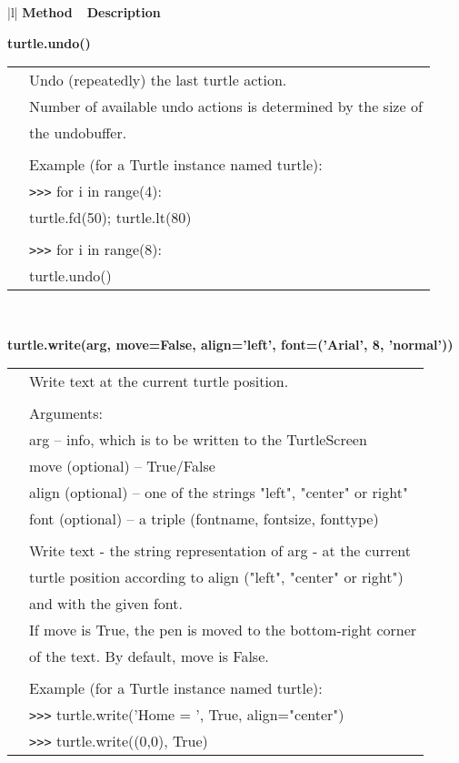 \begin{center}
{\small
\begin{tabular}{|l|} \hline
{\bf Method~~Description}  \\ \hline\hline 


{\bf    turtle.undo()} \\
   \begin{tabular}{p{0.25in}p{4in}}
&        Undo (repeatedly) the last turtle action. \\
&        Number of available undo actions is determined by the size of \\
&        the undobuffer. \\
&  \\
&        Example (for a Turtle instance named turtle): \\
&        \verb+>+\verb+>+\verb+>+ for i in range(4): \\
&                turtle.fd(50); turtle.lt(80) \\
&  \\
&        \verb+>+\verb+>+\verb+>+ for i in range(8): \\
&                turtle.undo() \\
\end{tabular} \\ \hline

{\bf    turtle.write(arg, move=False, align='left', font=('Arial', 8, 'normal'))} \\
   \begin{tabular}{p{0.25in}p{4in}}
&        Write text at the current turtle position. \\
&  \\
&        Arguments: \\
&        arg -- info, which is to be written to the TurtleScreen \\
&        move (optional) -- True/False \\
&        align (optional) -- one of the strings "left", "center" or right" \\
&        font (optional) -- a triple (fontname, fontsize, fonttype) \\
&  \\
&        Write text - the string representation of arg - at the current \\
&        turtle position according to align ("left", "center" or right") \\
&        and with the given font. \\
&        If move is True, the pen is moved to the bottom-right corner \\
&        of the text. By default, move is False. \\
&  \\
&        Example (for a Turtle instance named turtle): \\
&        \verb+>+\verb+>+\verb+>+ turtle.write('Home = ', True, align="center") \\
&        \verb+>+\verb+>+\verb+>+ turtle.write((0,0), True) \\
\end{tabular} \\ \hline


\end{tabular}}
\end{center}
